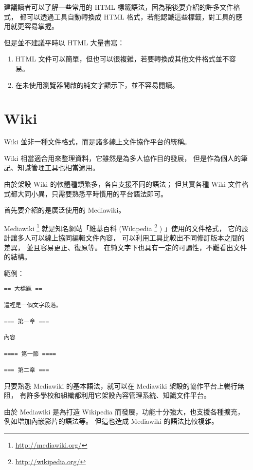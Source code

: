 \documentclass[a4paper,12pt,english]{sphinxmanual}
\begin{document}
建議讀者可以了解一些常用的 HTML 標籤語法，因為稍後要介紹的許多文件格式，
都可以透過工具自動轉換成 HTML 格式，若能認識這些標籤，對工具的應用就更容易掌握。

但是並不建議平時以 HTML 大量書寫：
\begin{enumerate}
\item {} 
HTML 文件可以簡單，但也可以很複雜，若要轉換成其他文件格式並不容易。

\item {} 
在未使用瀏覽器開啟的純文字顯示下，並不容易閱讀。

\end{enumerate}


\section{Wiki}
\label{syntax:wiki}
Wiki 並非一種文件格式，而是諸多線上文件協作平台的統稱。

Wiki 相當適合用來整理資料，它雖然是為多人協作目的發展，
但是作為個人的筆記、知識管理工具也相當適用。

由於架設 Wiki 的軟體種類繁多，各自支援不同的語法；
但其實各種 Wiki 文件格式都大同小異，只需要熟悉平時慣用的平台語法即可。

首先要介紹的是廣泛使用的 Mediawiki。

Mediawiki \footnote{
\href{http://mediawiki.org/}{http://mediawiki.org/}
} 就是知名網站「維基百科 (Wikipedia \footnote{
\href{http://wikipedia.org/}{http://wikipedia.org/}
} ) 」使用的文件格式，
它的設計讓多人可以線上協同編輯文件內容，
可以利用工具比較出不同修訂版本之間的差異，
並且容易更正、復原等。
在純文字下也具有一定的可讀性，不難看出文件的結構。

範例：

\begin{Verbatim}[commandchars=@\[\]]
== 大標題 ==

這裡是一個文字段落。

=== 第一章 ===

內容

==== 第一節 ====

=== 第二章 ===
\end{Verbatim}

只要熟悉 Mediawiki 的基本語法，就可以在 Mediawiki 架設的協作平台上暢行無阻，
有許多學校和組織都利用它架設內容管理系統、知識文件平台。

由於 Mediawiki 是為打造 Wikipedia 而發展，功能十分強大，也支援各種擴充，例如增加內嵌影片的語法等。
但這也造成 Mediawiki 的語法比較複雜。
\end{document}
